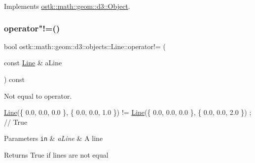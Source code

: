Implements \hyperlink{classostk_1_1math_1_1geom_1_1d3_1_1_object_a271a1964cd208be85ce9a0a429395ad8}{ostk\+::math\+::geom\+::d3\+::\+Object}.

\mbox{\label{classostk_1_1math_1_1geom_1_1d3_1_1objects_1_1_line_ae2dad60d3d1b08f5d17a2d87839d0830}} 
\subsubsection{\texorpdfstring{operator"!=()}{operator!=()}}
{\footnotesize\ttfamily bool ostk\+::math\+::geom\+::d3\+::objects\+::\+Line\+::operator!= (\begin{DoxyParamCaption}\item[{const \hyperlink{classostk_1_1math_1_1geom_1_1d3_1_1objects_1_1_line}{Line} \&}]{a\+Line }\end{DoxyParamCaption}) const}



Not equal to operator. 


\begin{DoxyCode}
\hyperlink{classostk_1_1math_1_1geom_1_1d3_1_1objects_1_1_line_a9ebdaaf67a4bd91780808f8683463ebe}{Line}(\{ 0.0, 0.0, 0.0 \}, \{ 0.0, 0.0, 1.0 \}) != \hyperlink{classostk_1_1math_1_1geom_1_1d3_1_1objects_1_1_line_a9ebdaaf67a4bd91780808f8683463ebe}{Line}(\{ 0.0, 0.0, 0.0 \}, \{ 0.0, 0.0, 2.0 \}) ; \textcolor{comment}{// True}
\end{DoxyCode}



\begin{DoxyParams}[1]{Parameters}
\mbox{\tt in}  & {\em a\+Line} & A line \\
\hline
\end{DoxyParams}
\begin{DoxyReturn}{Returns}
True if lines are not equal 
\end{DoxyReturn}
\mbox{\label{classostk_1_1math_1_1geom_1_1d3_1_1objects_1_1_line_a60d23a12b6f81685f430c0fd8ff07752}} 
